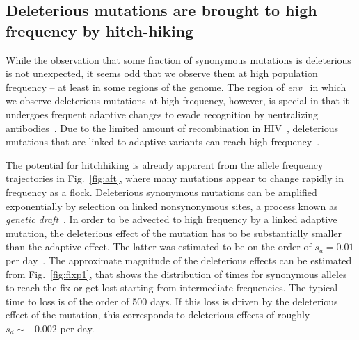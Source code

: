 \documentclass[rmp, twocolumn]{revtex4}
\newcommand{\FIG}[1]{Fig.~\ref{fig:#1}}
\newcommand{\env}{\textit{env}}
\begin{document}
\subsection{Deleterious mutations are brought to high frequency by hitch-hiking}

While the observation that some fraction of synonymous mutations is deleterious
is not unexpected, it seems odd that we observe them at high population
frequency -- at least in some regions of the genome. The region of \env~ in
which we observe deleterious mutations at high frequency, however, is special in
that it undergoes frequent adaptive changes to evade recognition by neutralizing
antibodies~\cite{williamson_adaptation_2003}. Due to the limited amount of
recombination in HIV~\cite{neher_recombination_2010,batorsky_estimate_2011},
deleterious mutations that are linked to adaptive variants can reach high
frequency~\citep[genetic hitchhiking,][]{smith_hitch-hiking_1974}.

The potential for hitchhiking is already apparent from the allele frequency
trajectories in \FIG{aft}, where many mutations appear to change rapidly in
frequency as a flock. Deleterious synonymous mutations can be amplified
exponentially by selection on linked nonsynonymous sites, a process known as
{\it genetic draft}~\citep{gillespie_genetic_2000, neher_genetic_2011}. In order
to be advected to high frequency by a linked adaptive mutation, the deleterious
effect of the mutation has to be substantially smaller than the adaptive effect.
The latter was estimated to be on the order of $s_a = 0.01$ per day~\citep{neher_recombination_2010}.
The approximate magnitude of the deleterious effects can be estimated from
\FIG{fixp1}, that shows the distribution of times for synonymous
alleles to reach the fix or get lost starting from intermediate frequencies. The
typical time to loss is of the order of 500 days. If this loss is driven by the
deleterious effect of the mutation, this corresponds to deleterious effects of
roughly $s_d \sim - 0.002$ per day.
\end{document}
